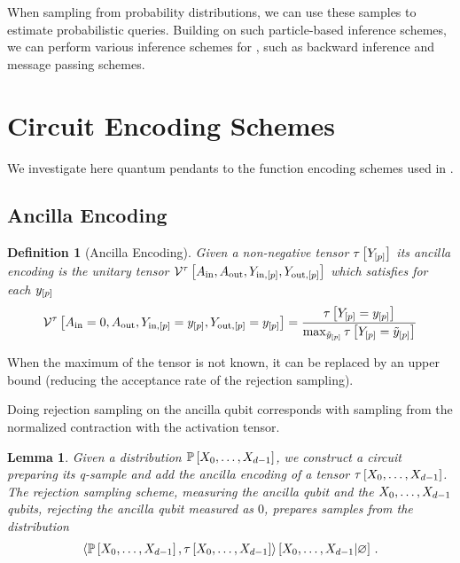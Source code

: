 \documentclass[aps,onecolumn,nofootinbib,pra]{article}
\newtheorem{lemma}{Lemma}
\newtheorem{definition}{Definition}
\begin{document}
    When sampling from probability distributions, we can use these samples to estimate probabilistic queries.
    Building on such particle-based inference schemes, we can perform various inference schemes for \ComputationActivationNetworks{}, such as backward inference and message passing schemes.


    \section{Circuit Encoding Schemes}

    We investigate here quantum pendants to the function encoding schemes used in \tnreason{}{}.

    \subsection{Ancilla Encoding}

    \begin{definition}[Ancilla Encoding]
        Given a non-negative tensor $\tau\left[Y_{[p]}\right]$ its ancilla encoding is the unitary tensor
        $\mathcal{V}^{\tau}\left[A_{\mathrm{in}},A_{\mathrm{out}},Y_{\mathrm{in},[p]},Y_{\mathrm{out},[p]}\right]$ which satisfies for each $y_{[p]}$
        \begin{align*}
            \mathcal{V}^{\tau}\left[A_{\mathrm{in}}=0,A_{\mathrm{out}},Y_{\mathrm{in},[p]}=y_{[p]},Y_{\mathrm{out},[p]}=y_{[p]}\right]
            = \frac{\tau\left[Y_{[p]}=y_{[p]}\right]}{\max_{\tilde{y}_{[p]}} \tau\left[Y_{[p]}=\tilde{y}_{[p]}\right]}
        \end{align*}
    \end{definition}

    When the maximum of the tensor is not known, it can be replaced by an upper bound (reducing the acceptance rate of the rejection sampling).

    Doing rejection sampling on the ancilla qubit corresponds with sampling from the normalized contraction with the activation tensor.

    \begin{lemma}
        Given a distribution $\mathbb{P}\left[X_{0},\ldots,X_{d-1}\right]$, we construct a circuit preparing its q-sample and add the ancilla encoding of a tensor $\tau\left[X_{0},\ldots,X_{d-1}\right]$.
        The rejection sampling scheme, measuring the ancilla qubit and the $X_{0},\ldots,X_{d-1}$ qubits, rejecting the ancilla qubit measured as $0$, prepares samples from the distribution
        \begin{align*}
            \left\langle \mathbb{P}\left[X_{0},\ldots,X_{d-1}\right],\tau\left[X_{0},\ldots,X_{d-1}\right]\right\rangle \left[ X_{0},\ldots,X_{d-1} | \varnothing \right] \, .
        \end{align*}
    \end{lemma}
\end{document}
